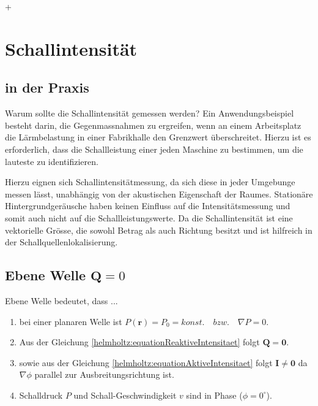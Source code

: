 
+%
%
%
%
\section{Schallintensität
\label{helmholtz:section:teil1}}


\subsection{in der Praxis}

Warum sollte die Schallintensität gemessen werden? Ein Anwendungsbeispiel besteht darin, die Gegenmassnahmen zu ergreifen, wenn an einem Arbeitsplatz die Lärmbelastung in einer Fabrikhalle den Grenzwert überschreitet. Hierzu ist es erforderlich, dass die Schallleistung einer jeden Maschine zu bestimmen, um die lauteste zu identifizieren.  \newline

Hierzu eignen sich Schallintensitätmessung, da sich diese in jeder Umgebunge messen lässt, unabhängig von der akustischen Eigenschaft der Raumes. Stationäre Hintergrundgeräusche haben keinen Einfluss auf die Intensitätsmessung und somit auch nicht auf die Schallleistungswerte. Da die Schallintensität ist eine vektorielle Grösse, die sowohl Betrag als auch Richtung besitzt und ist hilfreich in der Schallquellenlokalisierung.



\subsection{Ebene Welle $\mathbf{Q} = 0$
\label{helmholtz:subsection:ebeneWelle}}

Ebene Welle bedeutet, dass ...
\begin{enumerate}
\item bei einer planaren Welle ist $P (\mathbf{r}) = P_0 = konst.\quad bzw. \quad \nabla P = 0$.
\item Aus der Gleichung \eqref{helmholtz:equationReaktiveIntensitaet} folgt $\mathbf{Q} = \mathbf{0}$.
\item sowie aus der Gleichung \eqref{helmholtz:equationAktiveIntensitaet} folgt $\mathbf{I} \neq \mathbf{0}$ da $ \nabla \phi$ parallel zur Ausbreitungsrichtung ist.
\item Schalldruck $P$ und Schall-Geschwindigkeit $v$ sind in Phase ($\phi = 0^{\circ}$).
\end{enumerate}


